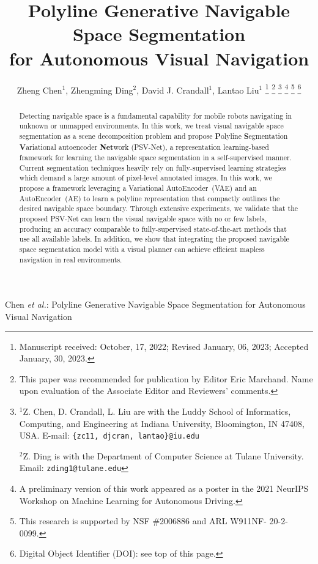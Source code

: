 \documentclass[letterpaper, 10 pt, journal, twoside]{ieeetran}
\begin{document}
\title{Polyline Generative Navigable Space Segmentation \\ for Autonomous Visual Navigation}

\author{Zheng Chen$^{1}$, Zhengming Ding$^{2}$, David J. Crandall$^{1}$, Lantao Liu$^{1}$
\thanks{Manuscript received: October, 17, 2022; Revised January, 06, 2023; Accepted January, 30, 2023.}%
\thanks{This paper was recommended for publication by Editor Eric Marchand. Name upon evaluation of the Associate Editor and Reviewers' comments.
} %
\thanks{ 
$^{1}$Z. Chen, D. Crandall, L. Liu are with the Luddy School of Informatics, Computing, and Engineering  at Indiana University, Bloomington, IN 47408, USA. E-mail:
        {\tt\small \{zc11, djcran, lantao\}@iu.edu} 
        
$^{2}$Z. Ding is with the Department of Computer Science at Tulane University. Email: 
{\tt\small zding1@tulane.edu}
}%
\thanks{A preliminary version of this work appeared
as a poster in the 2021 NeurIPS Workshop on Machine Learning for Autonomous Driving.}
\thanks{This research is supported by NSF \#2006886 and ARL W911NF-
20-2-0099.}
\thanks{Digital Object Identifier (DOI): see top of this page.}
}

{Chen \MakeLowercase{\textit{et al.}}: Polyline Generative Navigable Space Segmentation for Autonomous Visual Navigation} 

\maketitle

\begin{abstract}
Detecting navigable space is a fundamental capability for mobile robots navigating in unknown or unmapped environments. In this work, we treat  visual navigable space segmentation as a scene decomposition problem and propose  \textbf{P}olyline \textbf{S}egmentation \textbf{V}ariational autoencoder \textbf{Net}work (PSV-Net), a representation learning-based framework for learning the navigable space segmentation in a self-supervised manner. Current segmentation techniques heavily rely on fully-supervised learning strategies which demand a large amount of pixel-level annotated images. In this work, we propose a framework leveraging a  Variational AutoEncoder~(VAE) and an AutoEncoder~(AE) to learn a polyline representation that compactly outlines the desired navigable space boundary. Through extensive experiments, we  validate that the proposed PSV-Net can learn the visual navigable space with no or few labels, producing an  accuracy comparable to  fully-supervised state-of-the-art methods that use all available labels. In addition, we show that integrating the proposed navigable space segmentation model with a visual planner  can achieve efficient mapless navigation in real environments. 
\end{abstract}
\end{document}
